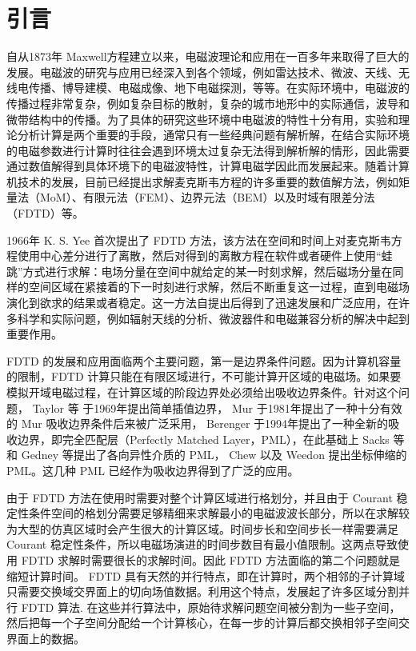 
\chapter{引言}

自从1873年 Maxwell方程建立以来，电磁波理论和应用在一百多年来取得了巨大的发展。电磁波的研究与应用已经深入到各个领域，例如雷达技术、微波、天线、无线电传播、博导建模、电磁成像、地下电磁探测，等等。在实际环境中，电磁波的传播过程非常复杂，例如复杂目标的散射，复杂的城市地形中的实际通信，波导和微带结构中的传播。为了具体的研究这些环境中电磁波的特性十分有用，实验和理论分析计算是两个重要的手段，通常只有一些经典问题有解析解，在结合实际环境的电磁参数进行计算时往往会遇到环境太过复杂无法得到解析解的情形，因此需要通过数值解得到具体环境下的电磁波特性，计算电磁学因此而发展起来。随着计算机技术的发展，目前已经提出求解麦克斯韦方程的许多重要的数值解方法，例如矩量法（MoM）、有限元法（FEM）、边界元法（BEM）以及时域有限差分法（FDTD）等。

1966年 K. S. Yee \cite{Yee} 首次提出了 FDTD 方法，该方法在空间和时间上对麦克斯韦方程使用中心差分进行了离散，然后对得到的离散方程在软件或者硬件上使用“蛙跳”方式进行求解：电场分量在空间中就给定的某一时刻求解，然后磁场分量在同样的空间区域在紧接着的下一时刻进行求解，然后不断重复这一过程，直到电磁场演化到欲求的结果或者稳定。这一方法自提出后得到了迅速发展和广泛应用，在许多科学和实际问题，例如辐射天线的分析、微波器件和电磁兼容分析的解决中起到重要作用。

FDTD 的发展和应用面临两个主要问题，第一是边界条件问题。因为计算机容量的限制，FDTD 计算只能在有限区域进行，不可能计算开区域的电磁场。如果要模拟开域电磁过程，在计算区域的阶段边界处必须给出吸收边界条件。针对这个问题， Taylor 等 \cite{taylor} 于1969年提出简单插值边界， Mur \cite{mur1981absorbing} 于1981年提出了一种十分有效的 Mur 吸收边界条件后来被广泛采用， Berenger \cite{berenger1994perfectly} 于1994年提出了一种全新的吸收边界，即完全匹配层（Perfectly Matched Layer，PML），在此基础上 Sacks \cite{sacks} 等和 Gedney \cite{gedney} 等提出了各向异性介质的 PML， Chew 以及 Weedon \cite{chew} 提出坐标伸缩的 PML。这几种 PML 已经作为吸收边界得到了广泛的应用。

由于 FDTD 方法在使用时需要对整个计算区域进行格划分，并且由于 Courant 稳定性条件空间的格划分需要足够精细来求解最小的电磁波波长部分，所以在求解较为大型的仿真区域时会产生很大的计算区域。时间步长和空间步长一样需要满足 Courant 稳定性条件，所以电磁场演进的时间步数目有最小值限制。这两点导致使用 FDTD 求解时需要很长的求解时间。因此 FDTD 方法面临的第二个问题就是缩短计算时间。 FDTD 具有天然的并行特点，即在计算时，两个相邻的子计算域只需要交换域交界面上的切向场值数据。利用这个特点，发展起了许多区域分割并行 FDTD 算法. 在这些并行算法中，原始待求解问题空间被分割为一些子空间，然后把每一个子空间分配给一个计算核心，在每一步的计算后都交换相邻子空间交界面上的数据。

